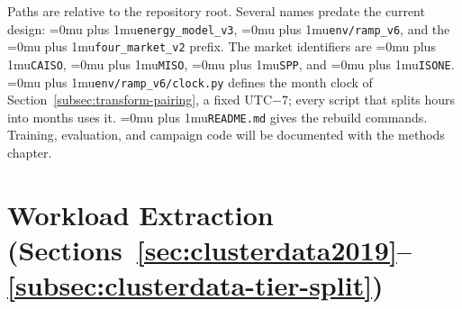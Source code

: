 \documentclass{UNCC-thesis}
\newcommand{\codepath}[1]{{\Urlmuskip=0mu plus 1mu\relax\nolinkurl{#1}}}
\begin{document}
Paths are relative to the repository root. Several names predate the current
design: \codepath{energy_model_v3}, \codepath{env/ramp_v6},
and the \codepath{four_market_v2} prefix. The market identifiers are
\codepath{CAISO}, \codepath{MISO}, \codepath{SPP}, and \codepath{ISONE}.
\codepath{env/ramp_v6/clock.py} defines the month clock of
Section~\ref{subsec:transform-pairing}, a fixed UTC\(-7\); every script that
splits hours into months uses it. \codepath{README.md} gives the rebuild
commands. Training, evaluation, and campaign code will be documented with the
methods chapter.

\section{Workload Extraction (Sections~\ref{sec:clusterdata2019}--\ref{subsec:clusterdata-tier-split})}
\end{document}
